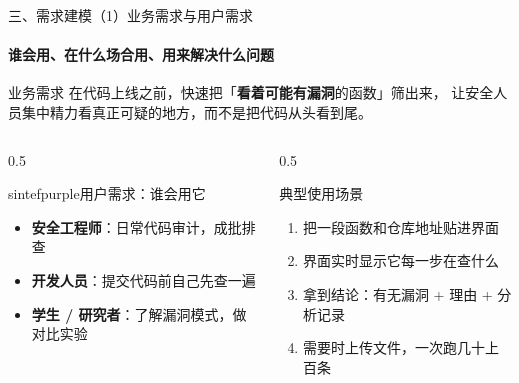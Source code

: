 \documentclass{beamer}
\begin{document}
\begin{frame}{三、需求建模（1）业务需求与用户需求}
\framesubtitle{谁会用、在什么场合用、用来解决什么问题}
\small
\begin{block}{业务需求}
在代码上线之前，快速把「\textbf{看着可能有漏洞}的函数」筛出来，
让安全人员集中精力看真正可疑的地方，而不是把代码从头看到尾。
\end{block}
\begin{columns}[t]
\begin{column}{0.5\textwidth}
\begin{colorblock}[white]{sintefpurple}{用户需求：谁会用它}
\begin{itemize}
\item \textbf{安全工程师}：日常代码审计，成批排查
\item \textbf{开发人员}：提交代码前自己先查一遍
\item \textbf{学生 / 研究者}：了解漏洞模式，做对比实验
\end{itemize}
\end{colorblock}
\end{column}
\begin{column}{0.5\textwidth}
\begin{block}{典型使用场景}
\begin{enumerate}
\item 把一段函数和仓库地址贴进界面
\item 界面实时显示它每一步在查什么
\item 拿到结论：有无漏洞 + 理由 + 分析记录
\item 需要时上传文件，一次跑几十上百条
\end{enumerate}
\end{block}
\end{column}
\end{columns}
\end{frame}
\end{document}
